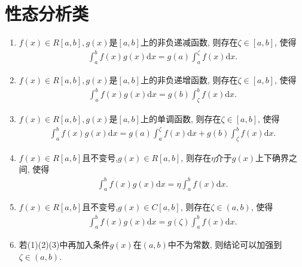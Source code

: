 \documentclass[../../main.tex]{subfiles}
\begin{document}
\section{性态分析类}

\begin{theorem}[积分中值定理]\label{theorem:积分中值定理}
\begin{enumerate}[(1)]
\item \label{theorem:积分中值定理(1)}\(f(x)\in R[a,b],g(x)\)是\([a,b]\)上的非负递减函数, 则存在\(\zeta\in[a,b]\), 使得
\begin{align*}
\int_{a}^{b}f(x)g(x)\mathrm{d}x = g(a)\int_{a}^{\zeta}f(x)\mathrm{d}x.
\end{align*}

\item \label{theorem:积分中值定理(2)} \(f(x)\in R[a,b],g(x)\)是\([a,b]\)上的非负递增函数, 则存在\(\zeta\in[a,b]\), 使得
\begin{align*}
\int_{a}^{b}f(x)g(x)\mathrm{d}x = g(b)\int_{\zeta}^{b}f(x)\mathrm{d}x.
\end{align*}

\item \label{theorem:积分中值定理(3)}\(f(x)\in R[a,b],g(x)\)是\([a,b]\)上的单调函数, 则存在\(\zeta\in[a,b]\), 使得
\begin{align*}
\int_{a}^{b}f(x)g(x)\mathrm{d}x = g(a)\int_{a}^{\zeta}f(x)\mathrm{d}x + g(b)\int_{\zeta}^{b}f(x)\mathrm{d}x.
\end{align*}

\item \label{theorem:积分中值定理(4)}\(f(x)\in R[a,b]\)且不变号,\(g(x)\in R[a,b]\), 则存在\(\eta\)介于\(g(x)\)上下确界之间, 使得
\begin{align*}
\int_{a}^{b}f(x)g(x)\mathrm{d}x = \eta\int_{a}^{b}f(x)\mathrm{d}x.
\end{align*}

\item \label{theorem:积分中值定理(5)}\(f(x)\in R[a,b]\)且不变号,\(g(x)\in C[a,b]\), 则存在\(\zeta\in(a,b)\), 使得
\begin{align*}
\int_{a}^{b}f(x)g(x)\mathrm{d}x = g(\zeta)\int_{a}^{b}f(x)\mathrm{d}x.
\end{align*}

\item 若(1)(2)(3)中再加入条件\(g(x)\)在\((a,b)\)中不为常数, 则结论可以加强到\(\zeta\in(a,b)\).
\end{enumerate}
\end{theorem}
\end{document}

